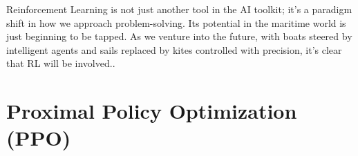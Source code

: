 Reinforcement Learning is not just another tool in the AI toolkit; it's a paradigm shift in how we approach problem-solving. Its potential in the maritime world is just beginning to be tapped. As we venture into the future, with boats steered by intelligent agents and sails replaced by kites controlled with precision, it's clear that RL will be involved.\cite{mnih2015humanlevel}.

\section{Proximal Policy Optimization (PPO)}\label{sec:ppo_background}






